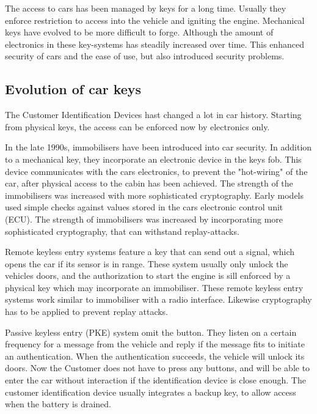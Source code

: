 The access to cars has been managed by keys for a long time. %
Usually they enforce restriction to access into the vehicle
and igniting the engine.
Mechanical keys have evolved to be more difficult to forge.
Although the amount of electronics in these key-systems has steadily increased over time.
This enhanced security of cars and the ease of use,
but also introduced security problems.

\subsection*{Evolution of car keys}
The Customer Identification Devices hast changed a lot in car history.
Starting from physical keys,
the access can be enforced now by electronics only.

In the late 1990s, immobilisers have been introduced into car security.
In addition to a mechanical key, 
they incorporate an electronic device in the keys fob.
This device communicates with the cars electronics,
to prevent the "hot-wiring" of the car,
after physical access to the cabin has been achieved.
The strength of the immobilisers was increased with more sophisticated cryptography.
Early models used simple checks against values stored in the cars electronic control unit (ECU).
The strength of immobilisers was increased by incorporating more
sophisticated cryptography,
that can withstand replay-attacks.	%

Remote keyless entry systems feature a key that can send out a signal,
which opens the car if its sensor is in range.
These system usually only unlock the vehicles doors,
and the authorization to start the engine is sill enforced by a physical key
which may incorporate an immobiliser.
These remote keyless entry systems work similar to immobiliser with a radio interface.
Likewise cryptography has to be applied to prevent replay attacks.

Passive keyless entry (PKE) system omit the button.
They listen on a certain frequency for a message from the vehicle
and reply if the message fits to initiate an authentication.
When the authentication succeeds, the vehicle will unlock its doors.
Now the Customer does not have to press any buttons,
and will be able to enter the car without interaction 
if the identification device is close enough.
The customer identification device usually integrates a backup key,
to allow access when the battery is drained.


